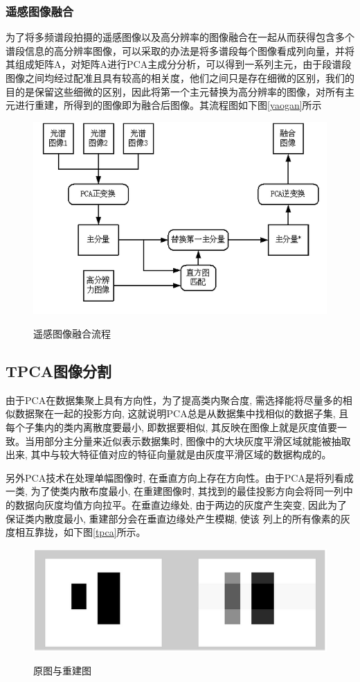 \documentclass[10pt,a4paper]{article}
\begin{document}
\begin{CJK*}{UTF8}{song}
\subsubsection{遥感图像融合}
为了将多频谱段拍摄的遥感图像以及高分辨率的图像融合在一起从而获得包含多个谱段信息的高分辨率图像，可以采取的办法是将多谱段每个图像看成列向量，并将其组成矩阵A，对矩阵A进行PCA主成分分析，可以得到一系列主元，由于段谱段图像之间均经过配准且具有较高的相关度，他们之间只是存在细微的区别，我们的目的是保留这些细微的区别，因此将第一个主元替换为高分辨率的图像，对所有主元进行重建，所得到的图像即为融合后图像。其流程图如下图\ref{yaogan}所示
\begin{figure}[!htbp]
	\centering
	\caption{遥感图像融合流程}  
		\includegraphics[scale=0.55]{figs/yaogan.png}
    	\label{fig:yaogan}
\end{figure}

\subsection{TPCA图像分割}
由于PCA在数据集聚上具有方向性，为了提高类内聚合度, 需选择能将尽量多的相似数据聚在一起的投影方向, 这就说明PCA总是从数据集中找相似的数据子集, 且每个子集内的类内离散度要最小, 即数据要相似, 其反映在图像上就是灰度值要一致。当用部分主分量来近似表示数据集时, 图像中的大块灰度平滑区域就能被抽取出来, 其中与较大特征值对应的特征向量就是由灰度平滑区域的数据构成的。   


另外PCA技术在处理单幅图像时, 在垂直方向上存在方向性。由于PCA是将列看成一类, 为了使类内散布度最小, 在重建图像时, 其找到的最佳投影方向会将同一列中的数据向灰度均值方向拉平。在垂直边缘处, 由于两边的灰度产生突变, 因此为了保证类内散度最小, 重建部分会在垂直边缘处产生模糊, 使该
列上的所有像素的灰度相互靠拢，如下图\ref{tpca}所示。
\begin{figure}[!htbp]
	\centering
	\caption{原图与重建图}  
		\includegraphics[scale=0.55]{figs/tpca.png}
    	\label{fig:tpca}
\end{figure}



\end{CJK*}
\end{document}
